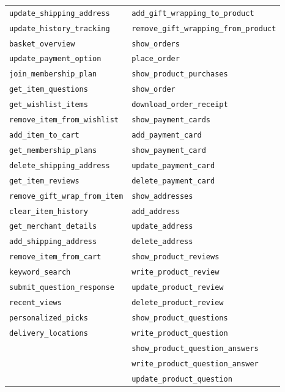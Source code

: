 \documentclass[11pt]{article}
\begin{document}
\begin{longtable}{ll}
\texttt{update\_shipping\_address} & \texttt{add\_gift\_wrapping\_to\_product} \\
\texttt{update\_history\_tracking} & \texttt{remove\_gift\_wrapping\_from\_product} \\
\texttt{basket\_overview} & \texttt{show\_orders} \\
\texttt{update\_payment\_option} & \texttt{place\_order} \\
\texttt{join\_membership\_plan} & \texttt{show\_product\_purchases} \\
\texttt{get\_item\_questions} & \texttt{show\_order} \\
\texttt{get\_wishlist\_items} & \texttt{download\_order\_receipt} \\
\texttt{remove\_item\_from\_wishlist} & \texttt{show\_payment\_cards} \\
\texttt{add\_item\_to\_cart} & \texttt{add\_payment\_card} \\
\texttt{get\_membership\_plans} & \texttt{show\_payment\_card} \\
\texttt{delete\_shipping\_address} & \texttt{update\_payment\_card} \\
\texttt{get\_item\_reviews} & \texttt{delete\_payment\_card} \\
\texttt{remove\_gift\_wrap\_from\_item} & \texttt{show\_addresses} \\
\texttt{clear\_item\_history} & \texttt{add\_address} \\
\texttt{get\_merchant\_details} & \texttt{update\_address} \\
\texttt{add\_shipping\_address} & \texttt{delete\_address} \\
\texttt{remove\_item\_from\_cart} & \texttt{show\_product\_reviews} \\
\texttt{keyword\_search} & \texttt{write\_product\_review} \\
\texttt{submit\_question\_response} & \texttt{update\_product\_review} \\
\texttt{recent\_views} & \texttt{delete\_product\_review} \\
\texttt{personalized\_picks} & \texttt{show\_product\_questions} \\
\texttt{delivery\_locations} & \texttt{write\_product\_question} \\
 & \texttt{show\_product\_question\_answers} \\
 & \texttt{write\_product\_question\_answer} \\
 & \texttt{update\_product\_question} \\

\end{longtable}
\end{document}
